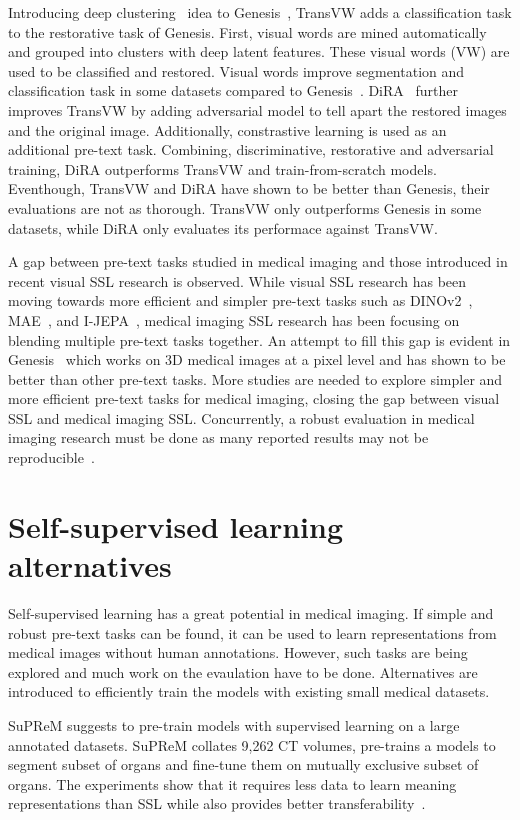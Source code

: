 \documentclass[a4paper,11pt,oneside]{report}
\begin{document}
Introducing deep clustering~\cite{Caron2018} idea to Genesis~\cite{Zhou2021}, TransVW adds a classification task to the restorative task of Genesis. First, visual words are mined automatically and grouped into clusters with deep latent features. These visual words (VW) are used to be classified and restored. Visual words improve segmentation and classification task in some datasets compared to Genesis~\cite{Haghighi2021}. DiRA~\cite{Haghighi2024} further improves TransVW by adding adversarial model to tell apart the restored images and the original image. Additionally, constrastive learning is used as an additional pre-text task. Combining, discriminative, restorative and adversarial training, DiRA outperforms TransVW and train-from-scratch models. Eventhough, TransVW and DiRA have shown to be better than Genesis, their evaluations are not as thorough. TransVW only outperforms Genesis in some datasets, while DiRA only evaluates its performace against TransVW.

A gap between pre-text tasks studied in medical imaging and those introduced in recent visual SSL research is observed. While visual SSL research has been moving towards more efficient and simpler pre-text tasks such as DINOv2~\cite{Oquab2024dinov}, MAE~\cite{He2022}, and I-JEPA~\cite{Assran2023}, medical imaging SSL research has been focusing on blending multiple pre-text tasks together. An attempt to fill this gap is evident in Genesis~\cite{Zhou2021} which works on 3D medical images at a pixel level and has shown to be better than other pre-text tasks. More studies are needed to explore simpler and more efficient pre-text tasks for medical imaging, closing the gap between visual SSL and medical imaging SSL. Concurrently, a robust evaluation in medical imaging research must be done as many reported results may not be reproducible~\cite{Isensee2024}.
\section{Self-supervised learning alternatives}
Self-supervised learning has a great potential in medical imaging. If simple and robust pre-text tasks can be found, it can be used to learn representations from medical images without human annotations. However, such tasks are being explored and much work on the evaulation have to be done. Alternatives are introduced to efficiently train the models with existing small medical datasets.

SuPReM suggests to pre-train models with supervised learning on a large annotated datasets. SuPReM collates 9,262 CT volumes, pre-trains a models to segment subset of organs and fine-tune them on mutually exclusive subset of organs. The experiments show that it requires less data to learn meaning representations than SSL while also provides better transferability~\cite{Li2024}.
\end{document}
